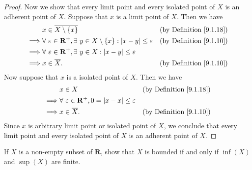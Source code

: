 \begin{proof}
    Now we show that every limit point and every isolated point of \(X\) is an adherent point of \(X\).
    Suppose that \(x\) is a limit point of \(X\).
    Then we have
    \begin{align*}
                 & x \in \overline{X \setminus \{x\}}                                                                      & \text{(by Definition \ref{9.1.18})} \\
        \implies & \forall\ \varepsilon \in \mathbf{R}^+, \exists\ y \in X \setminus \{x\} : \abs*{x - y} \leq \varepsilon & \text{(by Definition \ref{9.1.10})} \\
        \implies & \forall\ \varepsilon \in \mathbf{R}^+, \exists\ y \in X : \abs*{x - y} \leq \varepsilon                                                       \\
        \implies & x \in \overline{X}.                                                                                     & \text{(by Definition \ref{9.1.10})}
    \end{align*}
    Now suppose that \(x\) is a isolated point of \(X\).
    Then we have
    \begin{align*}
                 & x \in X                                                                  & \text{(by Definition \ref{9.1.18})} \\
        \implies & \forall\ \varepsilon \in \mathbf{R}^+, 0 = \abs*{x - x} \leq \varepsilon                                       \\
        \implies & x \in \overline{X}.                                                      & \text{(by Definition \ref{9.1.10})}
    \end{align*}
    Since \(x\) is arbitrary limit point or isolated point of \(X\), we conclude that every limit point and every isolated point of \(X\) is an adherent point of \(X\).
\end{proof}

\begin{exercise}\label{ex 9.1.10}
    If \(X\) is a non-empty subset of \(\mathbf{R}\), show that \(X\) is bounded if and only if \(\inf(X)\) and \(\sup(X)\) are finite.
\end{exercise}

